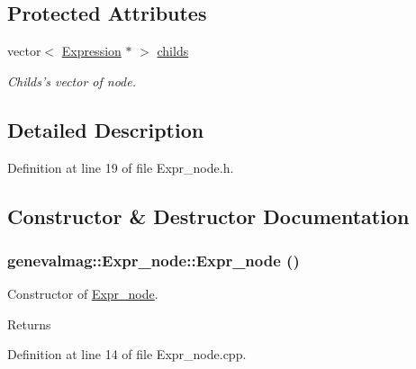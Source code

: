 \subsection*{Protected Attributes}
\begin{DoxyCompactItemize}
\item 
vector$<$ \hyperlink{classgenevalmag_1_1Expression}{Expression} $\ast$ $>$ \hyperlink{classgenevalmag_1_1Expr__node_a1fe0e44817e6f3ac688333e1714b31a3}{childs}
\begin{DoxyCompactList}\small\item\em Childs's vector of node. \item\end{DoxyCompactList}\end{DoxyCompactItemize}


\subsection{Detailed Description}


Definition at line 19 of file Expr\_\-node.h.



\subsection{Constructor \& Destructor Documentation}
\hypertarget{classgenevalmag_1_1Expr__node_af8c84be806b49faef74651ec80f9d34d}{
\subsubsection[{Expr\_\-node}]{\setlength{\rightskip}{0pt plus 5cm}genevalmag::Expr\_\-node::Expr\_\-node ()}}
\label{classgenevalmag_1_1Expr__node_af8c84be806b49faef74651ec80f9d34d}
Constructor of \hyperlink{classgenevalmag_1_1Expr__node}{Expr\_\-node}. \begin{DoxyReturn}{Returns}

\end{DoxyReturn}


Definition at line 14 of file Expr\_\-node.cpp.

